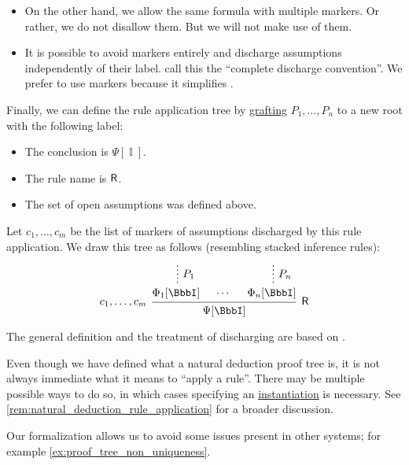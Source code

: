 \begin{definition}
\begin{thmenum}[resume=def:propositional_natural_deduction_proof_tree]
\begin{itemize}
      \item On the other hand, we allow the same formula with multiple markers. Or rather, we do not disallow them. But we will not make use of them.

      \item It is possible to avoid markers entirely and discharge assumptions independently of their label.  call this the \enquote{complete discharge convention}. We prefer to use markers because it simplifies .
    \end{itemize}

    Finally, we can define the rule application tree by \hyperref[def:ordered_tree_grafting_product]{grafting} \( P_1, \ldots, P_n \) to a new root with the following label:
    \begin{itemize}
      \item The conclusion is \( \Psi[\BbbI] \).
      \item The rule name is \( \textsf{\upshape R} \).
      \item The set of open assumptions was defined above.
    \end{itemize}

    Let \( c_1, \ldots, c_m \) be the list of markers of assumptions discharged by this rule application. We draw this tree as follows (resembling stacked inference rules):
    \begin{equation*}
      \begin{prooftree}
        \hypo{}
        \ellipsis { \( P_1 \) } { \Phi_1[\BbbI] }

        \hypo{ \cdots }

        \hypo{}
        \ellipsis { \( P_n \) } { \Phi_n[\BbbI] }
        \infer[left label={\( c_1, \ldots, c_m \)}]3[\logic{R}]{ \Psi[\BbbI] }
      \end{prooftree}
    \end{equation*}
  \end{thmenum}
\end{definition}
\begin{comments}
  \item The general definition and the treatment of discharging are based on \cite[\S 2.1]{TroelstraSchwichtenberg2000BasicProofTheory}.

  \item Even though we have defined what a natural deduction proof tree is, it is not always immediate what it means to \enquote{apply a rule}. There may be multiple possible ways to do so, in which cases specifying an \hyperref[def:propositional_schema_instantiation]{instantiation} is necessary. See \cref{rem:natural_deduction_rule_application} for a broader discussion.

  \item Our formalization allows us to avoid some issues present in other systems; for example \cref{ex:proof_tree_non_uniqueness}.
\end{comments}

